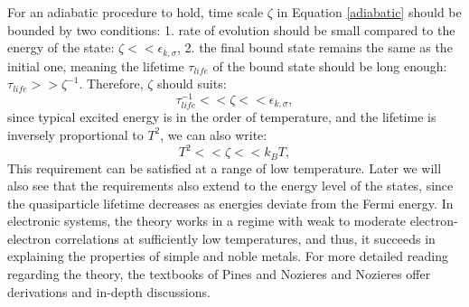 For an adiabatic procedure to hold, time scale $\zeta$ in Equation \ref{adiabatic} should be bounded by two conditions: 1. rate of evolution should be small compared to the energy of the state: $\zeta << \epsilon_{k,\sigma}$, 2. the final bound state remains the same as the initial one, meaning the lifetime $\tau_{life}$ of the bound state should be long enough: $\tau_{life} >> \zeta^{-1}$. Therefore, $\zeta$ should suits: 
\begin{equation}
	\tau_{life}^{-1} << \zeta << \epsilon_{k,\sigma},
\end{equation}
since typical excited energy is in the order of temperature, and the lifetime is inversely proportional to $T^2$, we can also write:
\begin{equation}
	T^2 << \zeta << k_B T,
\end{equation}
This requirement can be satisfied at a range of low temperature. Later we will also see that the requirements also extend to the energy level of the states, since the quasiparticle lifetime decreases as energies deviate from the Fermi energy. 
In electronic systems, the theory works in a regime with weak to moderate electron-electron correlations at sufficiently low temperatures, and thus, it succeeds in explaining the properties of simple and noble metals. For more detailed reading regarding the theory, the textbooks of Pines and Nozieres\cite{nozieresTheoryQuantumLiquids2018} and Nozieres \cite{nozieresDerivationLandauTheory1962} offer derivations and in-depth discussions. 

